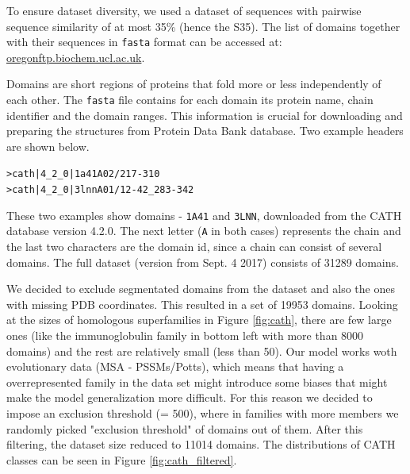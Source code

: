 To ensure dataset diversity, we used a dataset of sequences with pairwise sequence similarity of at most 35\% (hence the S35). 
The list of domains together with their sequences in \texttt{fasta} format can be accessed at: \href{ftp://orengoftp.biochem.ucl.ac.uk/cath/releases/latest-release/sequence-data/cath-domain-seqs-S35.fa}{oregonftp.biochem.ucl.ac.uk}.
    
Domains are short regions of proteins that fold more or less independently of each other. 
The \texttt{fasta} file contains for each domain its protein name, chain identifier and the domain ranges. 
This information is crucial for downloading and preparing the structures from Protein Data Bank database. 
Two example headers are shown below. 
    
\begin{center}
    \texttt{>cath|4\_2\_0|1a41A02/217-310}\\
    \texttt{>cath|4\_2\_0|3lnnA01/12-42\_283-342}
\end{center}
    
These two examples show domains - \texttt{1A41} and \texttt{3LNN}, downloaded from the CATH database version 4.2.0. 
The next letter (\texttt{A} in both cases) represents the chain and the last two characters are the domain id, since a chain can consist of several domains. 
The full dataset (version from Sept. 4 2017) consists of 31289 domains. 
    
We decided to exclude segmentated domains from the dataset and also the ones with missing PDB coordinates. 
This resulted in a set of 19953 domains. 
Looking at the sizes of homologous superfamilies in Figure \ref{fig:cath}, there are few large ones (like the immunoglobulin family in bottom left with more than 8000 domains) and the rest are relatively small (less than 50). 
Our model works woth evolutionary data (MSA - PSSMs/Potts), which means that having a overrepresented family in the data set might introduce some biases that might make the model generalization more difficult. 
For this reason we decided to impose an exclusion threshold (= 500), where in families with more members we randomly picked "exclusion threshold" of domains out of them. 
After this filtering, the dataset size reduced to 11014 domains. 
The distributions of CATH classes can be seen in Figure \ref{fig:cath_filtered}.
    
